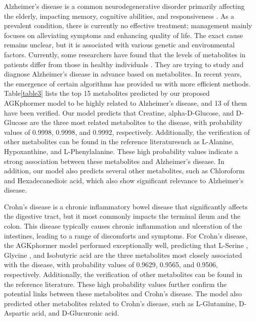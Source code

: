 \documentclass[lettersize,journal]{IEEEtran}
\begin{document}
Alzheimer's disease is a common neurodegenerative disorder primarily affecting the elderly, impacting memory, cognitive abilities, and responsiveness \cite{blennow2006alzheimer}. As a prevalent condition, there is currently no effective treatment; management mainly focuses on alleviating symptoms and enhancing quality of life. The exact cause remains unclear, but it is associated with various genetic and environmental factors.
Currently, some researchers have found that the levels of metabolites in patients differ from those in healthy individuals \cite{chen2013decoding}. They are trying to study and diagnose Alzheimer's disease in advance based on metabolites\cite{wilkins2018application}. In recent years, the emergence of certain algorithms has provided us with more efficient methods. Table\ref{table3} lists the top 15 metabolites predicted by our proposed AGKphormer model to be highly related to Alzheimer's disease, and 13 of them have been verified. Our model predicts that Creatine\cite{tsuruoka2013capillary}, alpha-D-Glucose, and D-Glucose\cite{redjems1998abnormal} are the three most related metabolites to the disease, with probability values of 0.9998, 0.9998, and 0.9992, respectively. Additionally, the verification of other metabolites can be found in the reference literaturesuch as L-Alanine, Hypoxanthine, and L-Phenylalanine. These high probability values indicate a strong association between these metabolites and Alzheimer's disease. In addition, our model also predicts several other metabolites, such as Chloroform and Hexadecanedioic acid, which also show significant relevance to Alzheimer's disease.

Crohn's disease is a chronic inflammatory bowel disease \cite{shanahan2002crohn} that significantly affects the digestive tract, but it most commonly impacts the terminal ileum and the colon. This disease typically causes chronic inflammation and ulceration of the intestines, leading to a range of discomforts and symptoms.
For Crohn's disease, the AGKphormer model performed exceptionally well, predicting that L-Serine \cite{kolho2017faecal}, Glycine \cite{bjerrum2015metabonomics}, and Isobutyric acid \cite{de2015faecal} are the three metabolites most closely associated with the disease, with probability values of 0.9629, 0.9565, and 0.9506, respectively. Additionally, the verification of other metabolites can be found in the reference literature. These high probability values further confirm the potential links between these metabolites and Crohn's disease. The model also predicted other metabolites related to Crohn's disease, such as L-Glutamine, D-Aspartic acid, and D-Glucuronic acid.
\end{document}
